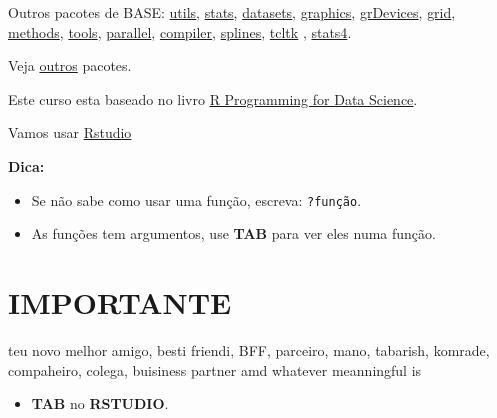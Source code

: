 \documentclass[]{book}
\providecommand{\tightlist}{%
  \setlength{\itemsep}{0pt}\setlength{\parskip}{0pt}}
\theoremstyle{definition}
\theoremstyle{definition}
\theoremstyle{definition}
\theoremstyle{remark}
\begin{document}
Outros pacotes de BASE:
\href{http://stat.ethz.ch/R-manual/R-devel/library/utils/html/00Index.html}{utils},
\href{http://stat.ethz.ch/R-manual/R-devel/library/stats/html/00Index.html}{stats},
\href{http://stat.ethz.ch/R-manual/R-devel/library/datasets/html/00Index.html}{datasets},
\href{http://stat.ethz.ch/R-manual/R-devel/library/graphics/html/00Index.html}{graphics},
\href{https://stat.ethz.ch/R-manual/R-devel/library/grDevices/html/00Index.html}{grDevices},
\href{https://stat.ethz.ch/R-manual/R-devel/library/grid/html/00Index.html}{grid},
\href{https://stat.ethz.ch/R-manual/R-devel/library/methods/html/00Index.html}{methods},
\href{https://stat.ethz.ch/R-manual/R-devel/library/tools/html/00Index.html}{tools},
\href{https://stat.ethz.ch/R-manual/R-devel/library/parallel/html/00Index.html}{parallel},
\href{https://stat.ethz.ch/R-manual/R-devel/library/compiler/html/00Index.html}{compiler},
\href{https://stat.ethz.ch/R-manual/R-devel/library/splines/html/00Index.html}{splines},
\href{https://stat.ethz.ch/R-manual/R-devel/library/tcltk/html/00Index.html}{tcltk}
,
\href{https://stat.ethz.ch/R-manual/R-devel/library/stats4/html/00Index.html}{stats4}.

Veja
\href{https://cran.r-project.org/web/packages/available_packages_by_name.html}{outros}
pacotes.

Este curso esta baseado no livro
\href{https://leanpub.com/rprogramming}{R Programming for Data Science}.

Vamos usar \href{https://www.rstudio.com/}{Rstudio}

\textbf{Dica:}

\begin{itemize}
\tightlist
\item
  Se não sabe como usar uma função, escreva: \texttt{?função}.
\item
  As funções tem argumentos, use \textbf{TAB} para ver eles numa função.
\end{itemize}

\section{IMPORTANTE}\label{importante}

teu novo melhor amigo, besti friendi, BFF, parceiro, mano, tabarish,
komrade, compaheiro, colega, buisiness partner amd whatever meanningful
is

\begin{itemize}
\tightlist
\item
  \textbf{TAB} no \textbf{RSTUDIO}.
\end{itemize}
\end{document}
